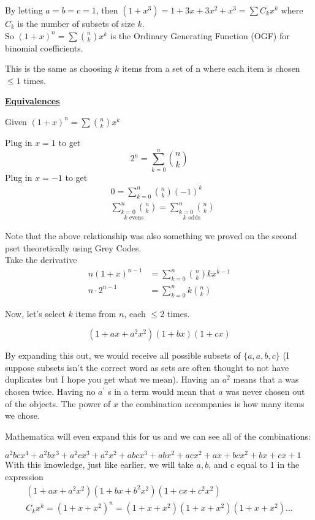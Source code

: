   By letting $a=b=c=1$, then $\left(1+x^{3}\right)=1+3 x+3 x^{2}+x^{3}=\sum C_{k} x^{k}$ where $C_{k}$ is the number of subsets of size $k$. \\

  So $(1+x)^{n}=\sum\binom n k x^{k}$ is the Ordinary Generating Function (OGF) for binomial coefficients.

  This is the same as choosing $k$ items from a set of $\mathrm{n}$ where each item is chosen $\leq 1$ times.

  \underline{\textbf{Equivalences}}

  Given $(1+x)^n = \sum \binom n k x^k$ 

  Plug in $x=1$ to get
$$
2^{n}=\sum_{k=0}^{n} \binom n k
$$
  Plug in $x=-1$ to get
$$
\begin{aligned}
& 0=\sum_{k=0}^{n} \binom nk (-1)^{k} \\
& \underset{k \text{ evens}}{\sum_{k=0}^n \binom n k}
= \underset{k \text{ odds}}{\sum_{k=0}^n \binom n k}
\end{aligned}
$$

  Note that the above relationship was also something we proved on the second pset theoretically using Grey Codes. \\

  Take the derivative
$$
\begin{aligned}
n(1+x)^{n-1} & =\sum_{k=0}^{n} \binom nk k x^{k-1} \\
n \cdot 2^{n-1} & =\sum_{k=0}^{n} k \binom n k
\end{aligned}
$$

  Now, let's select $k$ items from $n$, each $\leq 2$ times.

$$
\left(1+a x+a^{2} x^{2}\right)(1+b x)(1+c x)
$$

  By expanding this out, we would receive all possible subsets of $\{a, a, b, c\}$ (I suppose subsets isn't the correct word as sets are often thought to not have duplicates but I hope you get what we mean). Having an $a^{2}$ means that a was chosen twice. Having no $a^{\prime}$ s in a term would mean that $a$ was never chosen out of the objects. The power of $x$ the combination accompanies is how many items we chose.

  Mathematica will even expand this for us and we can see all of the combinations:

  $a^{2} b c x^{4}+a^{2} b x^{3}+a^{2} c x^{3}+a^{2} x^{2}+a b c x^{3}+a b x^{2}+a c x^{2}+a x+b c x^{2}+b x+c x+1$ With this knowledge, just like earlier, we will take $a, b$, and c equal to 1 in the expression
$$
\begin{gathered}
\left(1+a x+a^{2} x^{2}\right)\left(1+b x+b^{2} x^{2}\right)\left(1+c x+c^{2} x^{2}\right) \\
C_{k} x^{k}=\left(1+x+x^{2}\right)^{n}=\left(1+x+x^{2}\right)\left(1+x+x^{2}\right)\left(1+x+x^{2}\right) \ldots
\end{gathered}
$$

